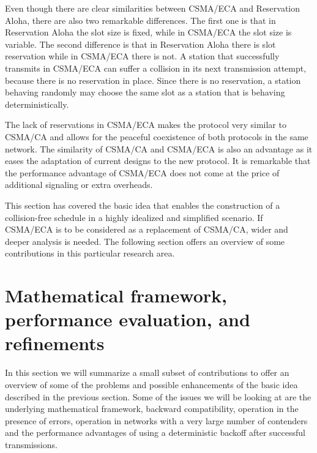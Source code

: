 \documentclass[journal]{IEEEtran}
\begin{document}

Even though there are clear similarities between CSMA/ECA and Reservation Aloha, there are also two remarkable differences.
The first one is that in Reservation Aloha the slot size is fixed, while in CSMA/ECA the slot size is variable.
The second difference is that in Reservation Aloha there is slot reservation while in CSMA/ECA there is not.
A station that successfully transmits in CSMA/ECA can suffer a collision in its next transmission attempt, because there is no reservation in place.
Since there is no reservation, a station behaving randomly may choose the same slot as a station that is behaving deterministically.

The lack of reservations in CSMA/ECA makes the protocol very similar to CSMA/CA and allows for the peaceful coexistence of both protocols in the same network.
The similarity of CSMA/CA and CSMA/ECA is also an advantage as it eases the adaptation of current designs to the new protocol.
It is remarkable that the performance advantage of CSMA/ECA does not come at the price of additional signaling or extra overheads.


This section has covered the basic idea that enables the construction of a collision-free schedule in a highly idealized and simplified scenario. If CSMA/ECA is to be considered as a replacement of CSMA/CA, wider and deeper analysis is needed. The following section offers an overview of some contributions in this particular research area.

\section{Mathematical framework, performance evaluation, and refinements}
\label{sec:survey}
In this section we will summarize a small subset of contributions to offer an overview of some of the problems and possible enhancements of the basic idea described in the previous section. 
Some of the issues we will be looking at are the underlying mathematical framework, backward compatibility, operation in the presence of errors, operation in networks with a very large number of contenders and the performance advantages of using a deterministic backoff after successful transmissions. 
\end{document}
